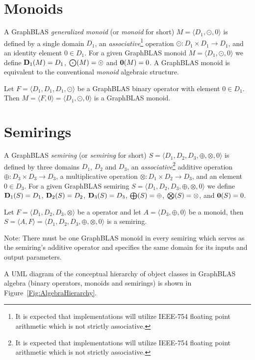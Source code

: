 \section{Monoids}

A GraphBLAS \emph{generalized monoid} (or \emph{monoid} for short) $M =
\langle D_1,\odot,0 \rangle$ is defined by a single domain $D_1$, an 
\emph{associative}\footnote{It is expected that implementations 
will utilize IEEE-754 floating point arithmetic which is not 
strictly associative.} 
operation $\odot: D_1 \times D_1 \rightarrow D_1$,
and an identity element $0 \in D_1$.  For a given GraphBLAS monoid $M=\langle
D_1,\odot,0 \rangle$ we define $\bold{D}_1(M) = D_1$, $\bold{\bigodot}(M) =
\odot$ and $\bold{0}(M) = 0$.  A GraphBLAS monoid is equivalent to 
the conventional \emph{monoid} algebraic structure.

Let $F = \langle D_1,D_1,D_1,\odot \rangle$ be a GraphBLAS binary operator
with element $0 \in D_1$.  Then $M = \langle F,0 \rangle = \langle
D_1,\odot,0 \rangle$ is a GraphBLAS monoid.

\section{Semirings}

A GraphBLAS \emph{semiring} (or \emph{semiring} for short)
$S=\langle D_1,D_2,D_3,\oplus,\otimes,0 \rangle$ is defined by
three domains $D_1$, $D_2$ and $D_3$, an \emph{associative}\footnote{It 
is expected that implementations will utilize IEEE-754 floating 
point arithmetic which is not strictly associative.} 
additive operation $\oplus : D_3 \times D_3 \rightarrow D_3$, 
a multiplicative operation $\otimes : D_1 \times D_2 \rightarrow
D_3$, and an element $0 \in D_3$.
For a given GraphBLAS semiring $S=\langle D_1,
D_2, D_3,\oplus,\otimes,0 \rangle$ we define $\bold{D}_1(S) = D_1$,
$\bold{D}_2(S) = D_2$, $\bold{D}_3(S) = D_3$, $\bold{\bigoplus}(S) =
\oplus$, $\bold{\bigotimes}(S) = \otimes$, and ${\bf 0}(S) = 0$. 

Let $F = \langle D_1,D_2,D_3,\otimes \rangle$ be a operator
and let $A = \langle D_3,\oplus,0 \rangle$ be a monoid,
then $S= \langle A,F \rangle = \langle D_1,D_2,D_3,\oplus,\otimes,0 \rangle$
is a semiring.

Note: There must be one GraphBLAS monoid in every semiring which 
serves as the semiring's additive operator and  
specifies the same domain for its inputs and output parameters. 

A UML diagram of the conceptual hierarchy of object classes in GraphBLAS
algebra (binary operators, monoids and semirings) is shown in 
Figure~\ref{Fig:AlgebraHierarchy}.

